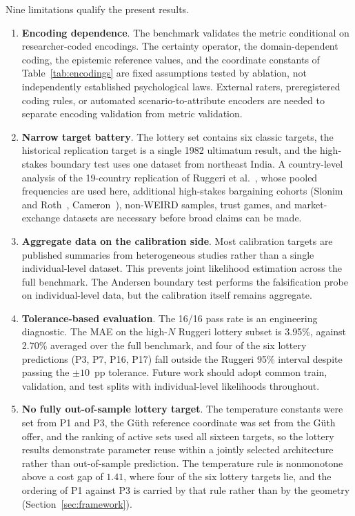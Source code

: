 \documentclass[journal]{IEEEtran}
\begin{document}
Nine limitations qualify the present results.
\begin{enumerate}
    \item \textbf{Encoding dependence}. The benchmark validates the metric conditional on researcher-coded encodings. The certainty operator, the domain-dependent coding, the epistemic reference values, and the coordinate constants of Table~\ref{tab:encodings} are fixed assumptions tested by ablation, not independently established psychological laws. External raters, preregistered coding rules, or automated scenario-to-attribute encoders are needed to separate encoding validation from metric validation.
    \item \textbf{Narrow target battery}. The lottery set contains six classic targets, the historical replication target is a single 1982 ultimatum result, and the high-stakes boundary test uses one dataset from northeast India. A country-level analysis of the 19-country replication of Ruggeri et al.~\cite{ruggeri2020}, whose pooled frequencies are used here, additional high-stakes bargaining cohorts (Slonim and Roth~\cite{slonim1998}, Cameron~\cite{cameron1999}), non-WEIRD samples, trust games, and market-exchange datasets are necessary before broad claims can be made.
    \item \textbf{Aggregate data on the calibration side}. Most calibration targets are published summaries from heterogeneous studies rather than a single individual-level dataset. This prevents joint likelihood estimation across the full benchmark. The Andersen boundary test performs the falsification probe on individual-level data, but the calibration itself remains aggregate.
    \item \textbf{Tolerance-based evaluation}. The 16/16 pass rate is an engineering diagnostic. The MAE on the high-$N$ Ruggeri lottery subset is 3.95\%, against 2.70\% averaged over the full benchmark, and four of the six lottery predictions (P3, P7, P16, P17) fall outside the Ruggeri 95\% interval despite passing the $\pm10$~pp tolerance. Future work should adopt common train, validation, and test splits with individual-level likelihoods throughout.
    \item \textbf{No fully out-of-sample lottery target}. The temperature constants were set from P1 and P3, the G\"uth reference coordinate was set from the G\"uth offer, and the ranking of active sets used all sixteen targets, so the lottery results demonstrate parameter reuse within a jointly selected architecture rather than out-of-sample prediction. The temperature rule is nonmonotone above a cost gap of $1.41$, where four of the six lottery targets lie, and the ordering of P1 against P3 is carried by that rule rather than by the geometry (Section~\ref{sec:framework}).

\end{enumerate}
\end{document}
